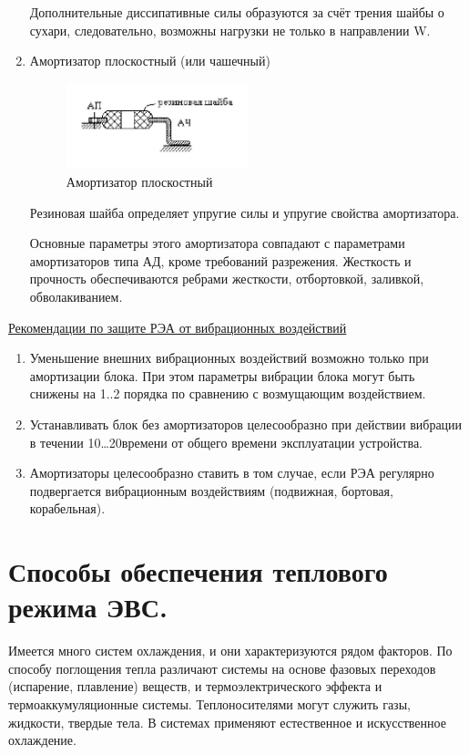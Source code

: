 \documentclass[unicode, 12pt, a4paper, oneside]{article}
\begin{document}
\begin{enumerate}
Дополнительные диссипативные силы образуются за счёт трения шайбы о сухари, следовательно, возможны нагрузки не только в направлении W.
\item Амортизатор плоскостный (или чашечный)

\begin{figure}[H]
\centering
\includegraphics[width=0.5\textwidth]{68_AP.JPG}
\caption{Амортизатор плоскостный}
\end{figure}

Резиновая шайба  определяет упругие силы и упругие свойства амортизатора.

Основные параметры этого амортизатора совпадают с параметрами амортизаторов типа АД, кроме  требований разрежения.
Жесткость и прочность обеспечиваются ребрами жесткости, отбортовкой, заливкой, обволакиванием.

\end{enumerate}

\underline{Рекомендации по защите РЭА от вибрационных воздействий} \nopagebreak
\begin{enumerate}
\item	Уменьшение внешних вибрационных воздействий возможно только при амортизации блока. При этом параметры вибрации блока могут быть снижены на 1..2 порядка по сравнению с возмущающим воздействием.
\item Устанавливать блок без амортизаторов целесообразно при действии вибрации в течении 10…20\textdiscount времени от общего времени эксплуатации устройства.
\item	Амортизаторы целесообразно ставить в том случае, если РЭА регулярно подвергается вибрационным воздействиям (подвижная, бортовая, корабельная).
\end{enumerate}

\section{Способы обеспечения теплового режима ЭВС.}

Имеется много систем охлаждения, и они характеризуются рядом факторов. По способу поглощения тепла различают системы на основе фазовых переходов (испарение, плавление) веществ, и термоэлектрического эффекта и термоаккумуляционные системы. Теплоносителями могут служить газы, жидкости, твердые тела. В системах применяют естественное и искусственное охлаждение.
\end{document}
